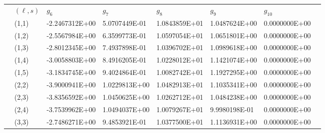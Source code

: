 \documentclass{warpdoc}
\begin{document}
\begin{table}[h]
\begin{center}
\begin{threeparttable}
\begin{tabular*}{\textwidth}{@{\extracolsep{\fill}}llllllll}
\cmidrule(lr{1em}){2-7}
 & $(\ell,s)$ & $g_6$ & $g_7$ & $g_8$ & $g_9$ & $g_{10}$ \\
\cmidrule(lr{1em}){2-7}	
&	(1,1)	&	-2.2467312E+00	&	5.0707449E-01	&	1.0843859E+01	&	1.0487624E+00	&	0.0000000E+00	\\
&	(1,2)	&	-2.5567984E+00	&	6.3599773E-01	&	1.0597054E+01	&	1.0651801E+00	&	0.0000000E+00	\\
&	(1,3)	&	-2.8012345E+00	&	7.4937898E-01	&	1.0396702E+01	&	1.0989618E+00	&	0.0000000E+00	\\
&	(1,4)	&	-3.0058803E+00	&	8.4916205E-01	&	1.0228012E+01	&	1.1421074E+00	&	0.0000000E+00	\\
&	(1,5)	&	-3.1834745E+00	&	9.4024864E-01	&	1.0082742E+01	&	1.1927295E+00	&	0.0000000E+00	\\
&	(2,2)	&	-3.9000941E+00	&	1.0229813E+00	&	1.0482913E+01	&	1.1035341E+00	&	0.0000000E+00	\\
&	(2,3)	&	-3.8356592E+00	&	1.0450625E+00	&	1.0262712E+01	&	1.0484238E+00	&	0.0000000E+00	\\
&	(2,4)	&	-3.7539962E+00	&	1.0494037E+00	&	1.0079267E+01	&	9.9980198E-01	&	0.0000000E+00	\\
&	(3,3)	&	-2.7486271E+00	&	9.4853921E-01	&	1.0377500E+01	&	1.1136931E+00	&	0.0000000E+00	\\
      \bottomrule
    \end{tabular*}
    \label{tab:electronneutralfitting}
  \end{threeparttable}
\end{center}
\end{table}
%
\end{document}
